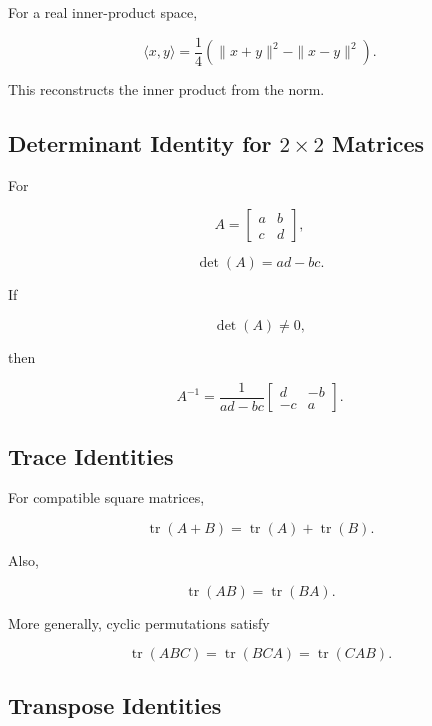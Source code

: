 For a real inner-product space,

\[
\boxed{
\langle x,y\rangle
=
\frac14
\left(
\|x+y\|^2
-
\|x-y\|^2
\right).
}
\]

This reconstructs the inner product from the norm.

\subsection{Determinant Identity for \(2\times2\) Matrices}
\label{subsec:determinant-two-by-two-identity}

For

\[
A
=
\begin{bmatrix}
a&b\\
c&d
\end{bmatrix},
\]

\[
\boxed{
\det(A)
=
ad-bc.
}
\]

If

\[
\det(A)\neq0,
\]

then

\[
\boxed{
A^{-1}
=
\frac{1}{ad-bc}
\begin{bmatrix}
d&-b\\
-c&a
\end{bmatrix}.
}
\]

\subsection{Trace Identities}
\label{subsec:trace-identities-reference}

For compatible square matrices,

\[
\boxed{
\operatorname{tr}(A+B)
=
\operatorname{tr}(A)
+
\operatorname{tr}(B).
}
\]

Also,

\[
\boxed{
\operatorname{tr}(AB)
=
\operatorname{tr}(BA).
}
\]

More generally, cyclic permutations satisfy

\[
\boxed{
\operatorname{tr}(ABC)
=
\operatorname{tr}(BCA)
=
\operatorname{tr}(CAB).
}
\]

\subsection{Transpose Identities}
\label{subsec:transpose-identities-reference}

